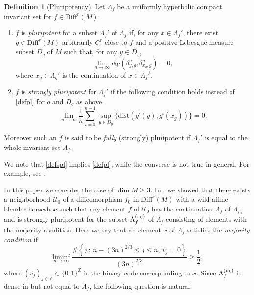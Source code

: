 \documentclass{amsart}
\theoremstyle{plain}
\theoremstyle{definition}
\newtheorem{dfn}[thm]{Definition}
\theoremstyle{remark}
\numberwithin{equation}{section}
\newcommand{\la}{\Lambda}
\newcommand{\D}{D}
\def\Diff{\mathrm{Diff}}
\begin{document}
\begin{dfn}[Pluripotency]\label{dfn1}
Let $\la_f $ be a uniformly hyperbolic compact invariant set for $f \in \Diff^{r}(M)$.
\begin{enumerate}[(1)] 
\item $f$  is \emph{pluripotent} for  a subset $\la_f'$ of $\la_f$ if, for any $x\in \la_f'$,  
there exist $g \in \Diff^r(M)$ arbitrarily $C^r$-close to $f$ and 
a positive Lebesgue measure subset $\D_g$ of $M$ such that, 
for any $y\in \D_g$, 
\begin{equation}\label{defpl}
\lim _{n\to \infty} d_W( \delta_{y,g}^n, \delta_{x_g,g}^n ) =0,
\end{equation}
where $x_g\in \la_g'$ is the continuation of $x\in \la_f'$. 
\item
$f$ is \emph{strongly pluripotent} for $\la_f'$ if the 
following condition holds instead of \eqref{defpl} for $g$ and $D_g$ as above.
\begin{equation}\label{defspl}
\lim _{n\to \infty} 
\frac{1}{n}\sum_{i=0}^{n-1}
\sup_{y\in \D_{g}}\{\mathrm{dist}(g^i(y),g^i(x_{g}))\}=0.
\end{equation}
\end{enumerate}
Moreover such an $f$ is said to be \emph{fully} (strongly) pluripotent if $\la_f'$ is equal to the whole 
invariant set $\la_f$.
\end{dfn}
We note that \eqref{defspl} implies \eqref{defpl}, while the converse is not true in 
general.
For example, see \cite[Theorem 1.8]{KNS}.




In this paper we consider the case of $\dim M\geq 3$.
In \cite[Theorem B]{KNS}, we showed that 
there exists a neighborhood $\mathcal{U}_0$ of a diffeomorphism $f_0$ in $\mathrm{Diff}^r(M)$ with a wild affine blender-horseshoe 
such that any element $f$ of $\mathcal{U}_0$ has the continuation $\Lambda_f$ of 
$\Lambda_{f_0}$ and is strongly pluripotent for 
the subset $\Lambda_f^{(\rm mj)}$ of 
$\Lambda_f$ consisting of elements with the majority condition.
Here we say that an element $x$ of $\Lambda_f$ satisfies the \emph{majority condition} if 
\begin{equation}\label{eqn_mj_cond}
\liminf_{n\to\infty}\frac{
\#\left\{
j\ ;\ 
n- (3n)^{2/3} \leq j\leq n,\ 
v_{j}=0
\right\}
}{(3n)^{2/3}}\geq \frac12,
\end{equation}
where 
$(v_j)_{j\in \mathbb{Z}}\in \{0,1\}^{\mathbb{Z}}$ is the binary code corresponding to $x$.
Since $\Lambda_f^{({\rm mj})}$ is dense in but not equal to $\Lambda_f$, the following question  is natural.
\end{document}
